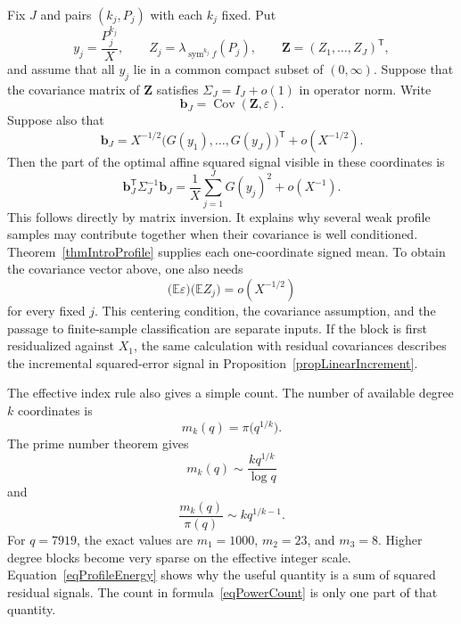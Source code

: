 \documentclass[12pt,reqno]{amsart}
\numberwithin{equation}{section}
\theoremstyle{plain}
\theoremstyle{definition}
\theoremstyle{remark}
\newcommand{\sym}{\operatorname{sym}}
\begin{document}
Fix $J$ and pairs $(k_j,P_j)$ with each $k_j$ fixed.  Put
\begin{equation*}
y_j=\frac{P_j^{k_j}}X,
\qquad
Z_j=\lambda_{\sym^{k_j}f}(P_j),
\qquad
\mathbf Z=(Z_1,\ldots,Z_J)^{\mathsf T},
\end{equation*}
and assume that all $y_j$ lie in a common compact subset of $(0,\infty)$.
Suppose that the covariance matrix of $\mathbf Z$ satisfies
$\Sigma_J=I_J+o(1)$ in operator norm.  Write
\begin{equation*}
\mathbf b_J=\operatorname{Cov}(\mathbf Z,\varepsilon).
\end{equation*}
Suppose also that
\begin{equation*}
\mathbf b_J
=
X^{-1/2}
\bigl(G(y_1),\ldots,G(y_J)\bigr)^{\mathsf T}
+o(X^{-1/2}).
\end{equation*}
Then the part of the optimal affine squared signal visible in these coordinates is
\begin{equation}
\label{eqProfileEnergy}
\mathbf b_J^{\mathsf T}\Sigma_J^{-1}\mathbf b_J
=
\frac{1}{X}\sum_{j=1}^J G(y_j)^2+o(X^{-1}).
\end{equation}
This follows directly by matrix inversion.  It explains why several weak profile samples may contribute together when their covariance is well conditioned.
Theorem~\ref{thmIntroProfile} supplies each one-coordinate signed mean.
To obtain the covariance vector above, one also needs
\begin{equation*}
\bigl(\mathbb E\varepsilon\bigr)
\bigl(\mathbb E Z_j\bigr)=o(X^{-1/2})
\end{equation*}
for every fixed $j$.
This centering condition, the covariance assumption, and the passage to finite-sample classification are separate inputs.
If the block is first residualized against $X_1$, the same calculation with residual covariances describes the incremental squared-error signal in Proposition~\ref{propLinearIncrement}.

The effective index rule also gives a simple count.  The number of available degree $k$ coordinates is
\begin{equation}
\label{eqPowerCount}
m_k(q)=\pi\bigl(q^{1/k}\bigr).
\end{equation}
The prime number theorem gives
\begin{equation*}
m_k(q)\sim \frac{kq^{1/k}}{\log q}
\end{equation*}
and
\begin{equation*}
\frac{m_k(q)}{\pi(q)}
\sim kq^{1/k-1}.
\end{equation*}
For $q=7919$, the exact values are $m_1=1000$, $m_2=23$, and $m_3=8$.
Higher degree blocks become very sparse on the effective integer scale.
Equation~\eqref{eqProfileEnergy} shows why the useful quantity is a sum of squared residual signals.
The count in formula~\eqref{eqPowerCount} is only one part of that quantity.
\end{document}
